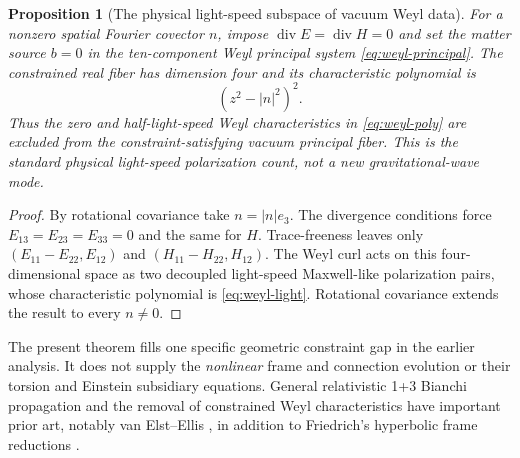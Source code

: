 \documentclass[11pt,a4paper]{article}
\newtheorem{proposition}{Proposition}
\begin{document}
\begin{proposition}[The physical
light-speed subspace of vacuum
Weyl data]\label{prop:weyl-physical}
For a nonzero spatial Fourier
covector $n$, impose
$\operatorname{div}E=
\operatorname{div}H=0$
and set the matter source $b=0$
in the ten-component Weyl
principal system
\eqref{eq:weyl-principal}.
The constrained real fiber
has dimension four and
its characteristic polynomial
is
\begin{equation}\label{eq:weyl-light}
\boxed{\quad
(z^2-|n|^2)^2.
\quad}
\end{equation}
Thus the zero and
half-light-speed Weyl
characteristics in
\eqref{eq:weyl-poly}
are excluded from the
constraint-satisfying vacuum
principal fiber. This is the
standard physical light-speed
polarization count, not a
new gravitational-wave mode.
\end{proposition}
\begin{proof}
By rotational covariance take
$n=|n|e_3$. The divergence
conditions force
$E_{13}=E_{23}=E_{33}=0$
and the same for $H$.
Trace-freeness leaves only
$(E_{11}-E_{22},E_{12})$
and
$(H_{11}-H_{22},H_{12})$.
The Weyl curl acts on this
four-dimensional space as
two decoupled light-speed
Maxwell-like polarization
pairs, whose characteristic
polynomial is
\eqref{eq:weyl-light}.
Rotational covariance extends
the result to every $n\ne0$.
\end{proof}

The present theorem fills one
specific geometric constraint
gap in the earlier analysis.
It does not supply the
\emph{nonlinear} frame
and connection evolution or
their torsion and Einstein
subsidiary equations. General
relativistic 1+3 Bianchi
propagation and the removal
of constrained Weyl
characteristics have important
prior art, notably
van Elst--Ellis
\cite{vanelst}, in addition to
Friedrich's hyperbolic frame
reductions \cite{friedrich}.
\end{document}
